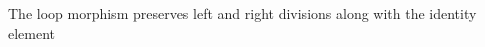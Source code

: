 \begin{comment}
    ∙-isMagmaIsomorphism    : ∙.IsMagmaIsomorphism ⟦_⟧
    ∙-isMagmaIsomorphism    = record
      \{ isMagmaMonomorphism = ∙-isMagmaMonomorphism
      ; surjective          = surjective
      \}

    \textbackslash\textbackslash-isMagmaIsomorphism   : \textbackslash\textbackslash.IsMagmaIsomorphism ⟦_⟧
    \textbackslash\textbackslash-isMagmaIsomorphism   = record
      \{ isMagmaMonomorphism = \textbackslash\textbackslash-isMagmaMonomorphism
      ; surjective          = surjective
      \}

    //-isMagmaIsomorphism   : //.IsMagmaIsomorphism ⟦_⟧
    //-isMagmaIsomorphism   = record
      \{ isMagmaMonomorphism = //-isMagmaMonomorphism
      ; surjective          = surjective
      \}

    open //.IsMagmaIsomorphism //-isMagmaIsomorphism public
      using (isRelIsomorphism)
\end{comment}

The loop morphism preserves left and right divisions along with the identity
element 

